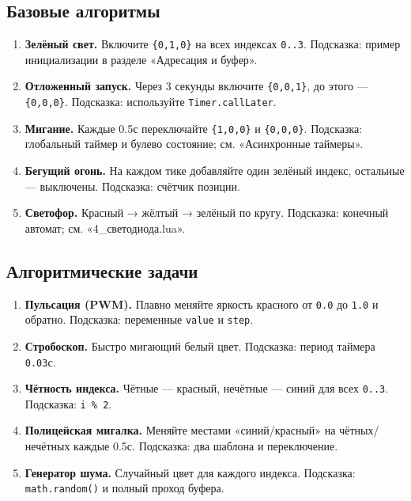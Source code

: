 \documentclass[a4paper,12pt]{article}
\begin{document}
\subsection{Базовые алгоритмы}
\begin{enumerate}
  \item \textbf{Зелёный свет.} Включите \verb|{0,1,0}| на всех индексах \verb|0..3|. Подсказка: пример инициализации в разделе «Адресация и буфер».
  \item \textbf{Отложенный запуск.} Через 3 секунды включите \verb|{0,0,1}|, до этого — \verb|{0,0,0}|. Подсказка: используйте \verb|Timer.callLater|.
  \item \textbf{Мигание.} Каждые 0.5с переключайте \verb|{1,0,0}| и \verb|{0,0,0}|. Подсказка: глобальный таймер и булево состояние; см. «Асинхронные таймеры».
  \item \textbf{Бегущий огонь.} На каждом тике добавляйте один зелёный индекс, остальные — выключены. Подсказка: счётчик позиции.
  \item \textbf{Светофор.} Красный → жёлтый → зелёный по кругу. Подсказка: конечный автомат; см. «4\_светодиода.lua».
\end{enumerate}
\subsection{Алгоритмические задачи}
\begin{enumerate}[resume]
  \item \textbf{Пульсация (PWM).} Плавно меняйте яркость красного от \verb|0.0| до \verb|1.0| и обратно. Подсказка: переменные \verb|value| и \verb|step|.
  \item \textbf{Стробоскоп.} Быстро мигающий белый цвет. Подсказка: период таймера \verb|0.03|с.
  \item \textbf{Чётность индекса.} Чётные — красный, нечётные — синий для всех \verb|0..3|. Подсказка: \verb|i % 2|.
  \item \textbf{Полицейская мигалка.} Меняйте местами «синий/красный» на чётных/нечётных каждые 0.5с. Подсказка: два шаблона и переключение.
  \item \textbf{Генератор шума.} Случайный цвет для каждого индекса. Подсказка: \verb|math.random()| и полный проход буфера.
\end{enumerate}
\end{document}
